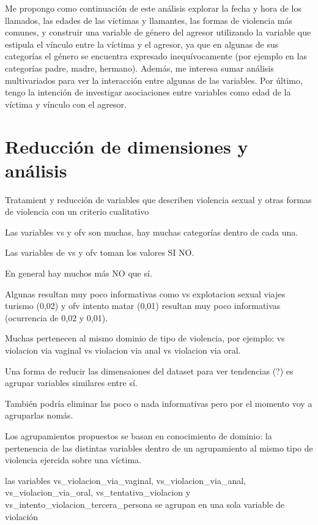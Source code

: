 \documentclass[10 pt]{article}
\begin{document}
Me propongo como continuación de este análisis explorar la fecha y hora de los llamados, las edades de las víctimas y llamantes, las formas de violencia más comunes, y construir una variable de género del agresor utilizando la variable que estipula el vínculo entre la víctima y el agresor, ya que en algunas de sus categorías el género se encuentra expresado inequívocamente (por ejemplo en las categorías padre, madre, hermano). Además, me interesa sumar análisis multivariados para ver la interacción entre algunas de las variables. Por último, tengo la intención de investigar asociaciones entre variables como edad de la víctima y vínculo con el agresor.




\section{Reducción de dimensiones y análisis}\label{red}




Tratamient y reducción de variables que describen violencia sexual y otras formas de violencia con un criterio cualitativo

Las variables vs y ofv son muchas, hay muchas categorías dentro de cada una.

Las variables de vs y ofv toman los valores SI NO.

En general hay muchos más NO que sí.

Algunas resultan muy poco informativas como vs explotacion sexual viajes turismo (0,02) y ofv intento matar (0,01) resultan muy poco informativas (ocurrencia de 0,02 y 0,01).

Muchas pertenecen al mismo dominio de tipo de violencia, por ejemplo: vs violacion via vaginal vs violacion via anal vs violacion via oral.

Una forma de reducir las dimensaiones del dataset para ver tendencias (?)  es agrupar variables similares entre sí.

También podría eliminar las poco o nada informativas pero por el momento voy a agruparlas nomás.

Los agrupamientos propuestos se basan en conocimiento de dominio: la pertenencia de las distintas variables dentro de un agrupamiento al mismo tipo de violencia ejercida sobre una víctima.




las variables vs\_violacion\_via\_vaginal,  vs\_violacion\_via\_anal,  vs\_violacion\_via\_oral, vs\_tentativa\_violacion y vs\_intento\_violacion\_tercera\_persona se agrupan en una sola variable de violación
\end{document}
